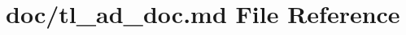 \hypertarget{tl__ad__doc_8md}{\section{doc/tl\-\_\-ad\-\_\-doc.md File Reference}
\label{tl__ad__doc_8md}
}
